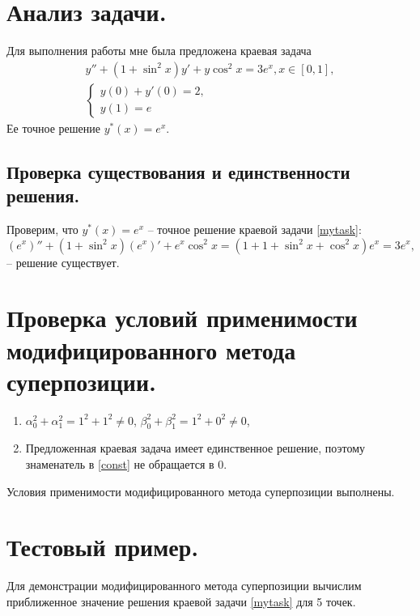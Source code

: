 \documentclass[a4paper, 12pt]{article}
\begin{document}
	\section{Анализ задачи.}
	
	Для выполнения работы мне была предложена краевая задача
	\begin{equation} \label{mytask}
		\begin{gathered}
			y''+(1+\sin^2x)y'+y\cos^2x=3e^x, x\in[0,1],\\
			\begin{cases}
				y(0)+y'(0)=2,\\
				y(1)=e
			\end{cases}
		\end{gathered}
	\end{equation}
	Ее точное решение $y^*(x)=e^x$. 
	
	\subsection{Проверка существования и единственности решения.}
	\label{solexistance}
	
	Проверим, что $y^*(x)=e^x$ -- точное решение краевой задачи \eqref{mytask}:
	\begin{equation*}
		(e^x)''+(1+\sin^2x)(e^x)'+e^x\cos^2x=(1+1+\sin^2x+\cos^2x)e^x=3e^x,
	\end{equation*}
	-- решение существует.
	
	\section{Проверка условий применимости модифицированного метода суперпозиции.}
	
	\begin{enumerate}
		\item $\alpha_0^2+\alpha_1^2=1^2+1^2\neq0$, $\beta_0^2+\beta_1^2=1^2+0^2\neq0$,
		\item Предложенная краевая задача имеет единственное решение, поэтому знаменатель в \eqref{const} не обращается в 0.
	\end{enumerate}
	
	Условия применимости модифицированного метода суперпозиции выполнены.
	
	\section{Тестовый пример.} \label{testexample}
	
	Для демонстрации модифицированного метода суперпозиции вычислим приближенное значение решения краевой задачи \eqref{mytask} для 5 точек.
	
\end{document}
